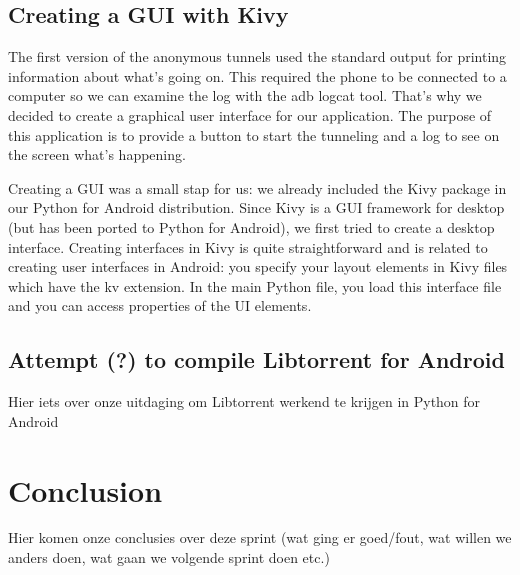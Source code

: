 \documentclass{article}
\begin{document}
\subsection{Creating a GUI with Kivy}
The first version of the anonymous tunnels used the standard output for printing information about what’s going on. This required the phone to be connected to a computer so we can examine the log with the adb logcat tool. That’s why we decided to create a graphical user interface for our application. The purpose of this application is to provide a button to start the tunneling and a log to see on the screen what’s happening.

Creating a GUI was a small stap for us: we already included the Kivy package in our Python for Android distribution. Since Kivy is a GUI framework for desktop (but has been ported to Python for Android), we first tried to create a desktop interface. Creating interfaces in Kivy is quite straightforward and is related to creating user interfaces in Android: you specify your layout elements in Kivy files which have the kv extension. In the main Python file, you load this interface file and you can access properties of the UI elements.

\subsection{Attempt (?) to compile Libtorrent for Android}
Hier iets over onze uitdaging om Libtorrent werkend te krijgen in Python for Android

\section{Conclusion}
Hier komen onze conclusies over deze sprint (wat ging er goed/fout, wat willen we anders doen, wat gaan we volgende sprint doen etc.)
\end{document}
